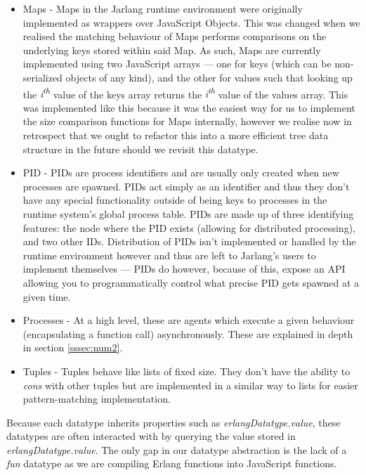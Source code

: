\documentclass[twoside,12pt,titlepage,a4paper]{article}
\begin{document}
\begin{itemize}
\item Maps - Maps in the Jarlang runtime environment were originally implemented as wrappers over JavaScript Objects. This was changed when we realised the matching behaviour of Maps performs comparisons on the underlying keys stored within said Map. As such, Maps are currently implemented using two JavaScript arrays --- one for keys (which can be non-serialized objects of any kind), and the other for values such that looking up the \textit{i\textsuperscript{th}} value of the keys array returns the \textit{i\textsuperscript{th}} value of the values array. This was implemented like this because it was the easiest way for us to implement the size comparison functions for Maps internally, however we realise now in retrospect that we ought to refactor this into a more efficient tree data structure in the future should we revisit this datatype.

\item PID - PIDs are process identifiers and are usually only created when new processes are spawned. PIDs act simply as an identifier and thus they don't have any special functionality outside of being keys to processes in the runtime system's global process table. PIDs are made up of three identifying features: the node where the PID exists (allowing for distributed processing), and two other IDs. Distribution of PIDs isn't implemented or handled by the runtime environment however and thus are left to Jarlang's users to implement themselves --- PIDs do however, because of this, expose an API allowing you to programmatically control what precise PID gets spawned at a given time.

\item Processes - At a high level, these are agents which execute a given behaviour (encapsulating a function call) asynchronously. These are explained in depth in section \ref{sssec:num2}.

\item Tuples - Tuples behave like lists of fixed size. They don't have the ability to \textit{cons} with other tuples but are implemented in a similar way to lists for easier pattern-matching implementation.

\end{itemize}

Because each datatype inherits properties such as \textit{erlangDatatype.value}, these datatypes are often interacted with by querying the value stored in \textit{erlangDatatype.value}. The only gap in our datatype abstraction is the lack of a \textit{fun} datatype as we are compiling Erlang functions into JavaScript functions. 
\end{document}
